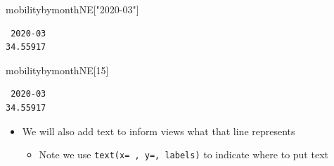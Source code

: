 \documentclass[
  letterpaper,
  DIV=11,
  numbers=noendperiod]{scrreprt}
\newenvironment{Shaded}{\begin{snugshade}}{\end{snugshade}}
\newcommand{\DecValTok}[1]{\textcolor[rgb]{0.68,0.00,0.00}{#1}}
\newcommand{\NormalTok}[1]{\textcolor[rgb]{0.00,0.23,0.31}{#1}}
\newcommand{\StringTok}[1]{\textcolor[rgb]{0.13,0.47,0.30}{#1}}
\providecommand{\tightlist}{%
  \setlength{\itemsep}{0pt}\setlength{\parskip}{0pt}}\usepackage{longtable,booktabs,array}
\begin{document}
\begin{Shaded}
\begin{Highlighting}[]
\NormalTok{mobilitybymonthNE[}\StringTok{"2020{-}03"}\NormalTok{]}
\end{Highlighting}
\end{Shaded}

\begin{verbatim}
 2020-03 
34.55917 
\end{verbatim}

\begin{Shaded}
\begin{Highlighting}[]
\NormalTok{mobilitybymonthNE[}\DecValTok{15}\NormalTok{]}
\end{Highlighting}
\end{Shaded}

\begin{verbatim}
 2020-03 
34.55917 
\end{verbatim}

\begin{itemize}
\tightlist
\item
  We will also add text to inform views what that line represents

  \begin{itemize}
  \tightlist
  \item
    Note we use \texttt{text(x=\ ,\ y=,\ labels)} to indicate where to
    put text
  \end{itemize}
\end{itemize}
\end{document}
